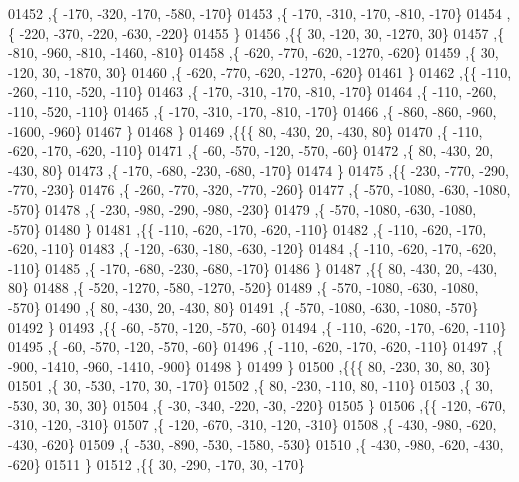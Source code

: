 \begin{DoxyCode}
01452     ,\{  -170,  -320,  -170,  -580,  -170\}
01453     ,\{  -170,  -310,  -170,  -810,  -170\}
01454     ,\{  -220,  -370,  -220,  -630,  -220\}
01455     \}
01456    ,\{\{    30,  -120,    30, -1270,    30\}
01457     ,\{  -810,  -960,  -810, -1460,  -810\}
01458     ,\{  -620,  -770,  -620, -1270,  -620\}
01459     ,\{    30,  -120,    30, -1870,    30\}
01460     ,\{  -620,  -770,  -620, -1270,  -620\}
01461     \}
01462    ,\{\{  -110,  -260,  -110,  -520,  -110\}
01463     ,\{  -170,  -310,  -170,  -810,  -170\}
01464     ,\{  -110,  -260,  -110,  -520,  -110\}
01465     ,\{  -170,  -310,  -170,  -810,  -170\}
01466     ,\{  -860,  -860,  -960, -1600,  -960\}
01467     \}
01468    \}
01469   ,\{\{\{    80,  -430,    20,  -430,    80\}
01470     ,\{  -110,  -620,  -170,  -620,  -110\}
01471     ,\{   -60,  -570,  -120,  -570,   -60\}
01472     ,\{    80,  -430,    20,  -430,    80\}
01473     ,\{  -170,  -680,  -230,  -680,  -170\}
01474     \}
01475    ,\{\{  -230,  -770,  -290,  -770,  -230\}
01476     ,\{  -260,  -770,  -320,  -770,  -260\}
01477     ,\{  -570, -1080,  -630, -1080,  -570\}
01478     ,\{  -230,  -980,  -290,  -980,  -230\}
01479     ,\{  -570, -1080,  -630, -1080,  -570\}
01480     \}
01481    ,\{\{  -110,  -620,  -170,  -620,  -110\}
01482     ,\{  -110,  -620,  -170,  -620,  -110\}
01483     ,\{  -120,  -630,  -180,  -630,  -120\}
01484     ,\{  -110,  -620,  -170,  -620,  -110\}
01485     ,\{  -170,  -680,  -230,  -680,  -170\}
01486     \}
01487    ,\{\{    80,  -430,    20,  -430,    80\}
01488     ,\{  -520, -1270,  -580, -1270,  -520\}
01489     ,\{  -570, -1080,  -630, -1080,  -570\}
01490     ,\{    80,  -430,    20,  -430,    80\}
01491     ,\{  -570, -1080,  -630, -1080,  -570\}
01492     \}
01493    ,\{\{   -60,  -570,  -120,  -570,   -60\}
01494     ,\{  -110,  -620,  -170,  -620,  -110\}
01495     ,\{   -60,  -570,  -120,  -570,   -60\}
01496     ,\{  -110,  -620,  -170,  -620,  -110\}
01497     ,\{  -900, -1410,  -960, -1410,  -900\}
01498     \}
01499    \}
01500   ,\{\{\{    80,  -230,    30,    80,    30\}
01501     ,\{    30,  -530,  -170,    30,  -170\}
01502     ,\{    80,  -230,  -110,    80,  -110\}
01503     ,\{    30,  -530,    30,    30,    30\}
01504     ,\{   -30,  -340,  -220,   -30,  -220\}
01505     \}
01506    ,\{\{  -120,  -670,  -310,  -120,  -310\}
01507     ,\{  -120,  -670,  -310,  -120,  -310\}
01508     ,\{  -430,  -980,  -620,  -430,  -620\}
01509     ,\{  -530,  -890,  -530, -1580,  -530\}
01510     ,\{  -430,  -980,  -620,  -430,  -620\}
01511     \}
01512    ,\{\{    30,  -290,  -170,    30,  -170\}

\end{DoxyCode}
